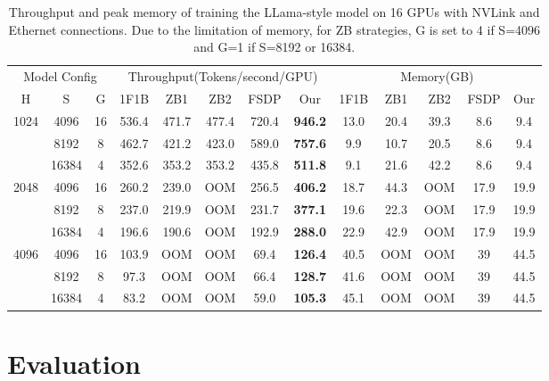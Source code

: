 \documentclass[sigplan,review]{acmart}
\begin{document}
\begin{table}[!ht]
\centering
\caption{Throughput and peak memory of training the LLama-style model on 16 GPUs with NVLink and Ethernet connections. Due to the limitation of memory, for ZB strategies, G is set to 4 if S=4096 and G=1 if S=8192 or 16384.}
\begin{tabular}{ccc|ccccc|ccccc}
\hline
\multicolumn{3}{c|}{Model Config}  & \multicolumn{5}{c|}{Throughput(Tokens/second/GPU)} & \multicolumn{5}{c}{Memory(GB)}   \\
H                     & S     & G  & 1F1B   & ZB1    & ZB2    & FSDP  & Our            & 1F1B & ZB1  & ZB2  & FSDP & Our  \\ \hline
\multirow{3}{*}{1024} & 4096  & 16 & 536.4  & 471.7  & 477.4  & 720.4 & \textbf{946.2} & 13.0 & 20.4 & 39.3 & 8.6  & 9.4  \\
                      & 8192  & 8  & 462.7  & 421.2  & 423.0  & 589.0 & \textbf{757.6} & 9.9  & 10.7 & 20.5 & 8.6  & 9.4  \\
                      & 16384 & 4  & 352.6  & 353.2  & 353.2  & 435.8 & \textbf{511.8} & 9.1  & 21.6 & 42.2 & 8.6  & 9.4  \\ \hline
\multirow{3}{*}{2048} & 4096  & 16 & 260.2  & 239.0  & OOM    & 256.5 & \textbf{406.2} & 18.7 & 44.3 & OOM  & 17.9 & 19.9 \\
                      & 8192  & 8  & 237.0  & 219.9  & OOM    & 231.7 & \textbf{377.1} & 19.6 & 22.3 & OOM  & 17.9 & 19.9 \\
                      & 16384 & 4  & 196.6  & 190.6  & OOM    & 192.9 & \textbf{288.0} & 22.9 & 42.9 & OOM  & 17.9 & 19.9 \\ \hline
\multirow{3}{*}{4096} & 4096  & 16 & 103.9  & OOM    & OOM    & 69.4  & \textbf{126.4} & 40.5 & OOM  & OOM  & 39   & 44.5 \\
                      & 8192  & 8  & 97.3   & OOM    & OOM    & 66.4  & \textbf{128.7} & 41.6 & OOM  & OOM  & 39   & 44.5 \\
                      & 16384 & 4  & 83.2   & OOM    & OOM    & 59.0  & \textbf{105.3} & 45.1 & OOM  & OOM  & 39   & 44.5 \\ \hline
\end{tabular}
\label{tab:perform_nvlink}
\end{table}

\section{Evaluation}
\end{document}
